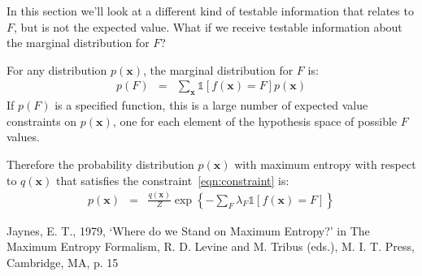 \documentclass[letterpaper, 11pt]{article}
\newcommand{\xx}{\boldsymbol{x}}
\begin{document}
In this section we'll look at a different kind of testable information that
relates to $F$, but is not the expected value. What if we receive testable
information about the marginal distribution for $F$?

For any distribution $p(\xx)$, the marginal distribution for $F$ is:
\begin{eqnarray}
p(F) &=& \sum_{\xx}\mathds{1}\left[f(\xx) = F\right]p(\xx)\label{eqn:constraint}
\end{eqnarray}
If $p(F)$ is a specified function, this is a large number of expected
value constraints on $p(\xx)$, one for each element of the hypothesis space
of possible $F$ values.

Therefore the probability distribution
$p(\xx)$ with maximum entropy with respect to $q(\xx)$ that satisfies the
constraint~\ref{eqn:constraint} is:
\begin{eqnarray}
p(\xx) &=& \frac{q(\xx)}{Z}\exp\left\{-\sum_F \lambda_F \mathds{1}
\left[f(\xx) = F\right]  \right\}
\end{eqnarray}





\begin{thebibliography}{}
Jaynes, E. T., 1979, `Where do we Stand on Maximum Entropy?' in The Maximum Entropy Formalism, R. D. Levine and M. Tribus (eds.), M. I. T. Press, Cambridge, MA, p. 15
\end{thebibliography}
\end{document}
